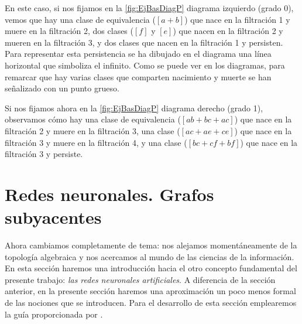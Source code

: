 \documentclass[12pt, a4paper, twoside]{book}
\numberwithin{equation}{section}
\theoremstyle{definition}
\newenvironment{ejem}
  {\pushQED{\qed}\renewcommand{\qedsymbol}{$\blacktriangleleft$}\ejemplo}
  {\popQED\endejemplo}
\theoremstyle{remark}
\theoremstyle{plain}
\begin{document}
\begin{ejem}
	En este caso, si nos fijamos en la \autoref{fig:EjBasDiagP} 
	diagrama izquierdo (grado 0), vemos
	que hay una clase de equivalencia ($[a+b]$) que nace en la 
	filtración 1 y muere en la filtración 2, dos clases ($[f]$ y $[e]$) 
	que 
	nacen en la filtración 2 y mueren en la filtración 3, y dos clases que
	nacen en la filtración 1 y persisten. Para representar esta 
	persistencia se ha dibujado en el diagrama una línea horizontal que 
	simboliza el infinito. Como se puede ver en los diagramas, para 
	remarcar que hay varias clases que comparten nacimiento y muerte se 
	han señalizado con un punto grueso.

	Si nos fijamos ahora en la \autoref{fig:EjBasDiagP} diagrama 
	derecho (grado 1), observamos cómo
	hay una clase de equivalencia ($[ab+bc+ac]$) que nace en la filtración 
	2
	y muere en la filtración 3, una clase ($[ac+ae+ce]$) que nace en la 
	filtración 3 y muere en la filtración 4, y una clase ($[bc+cf+bf]$) 
	que nace en la filtración 3 y persiste.
	\end{ejem}

	\section{Redes neuronales. Grafos subyacentes}
	
	Ahora cambiamos completamente de tema: nos alejamos momentáneamente de 
	la topología algebraica y nos acercamos al mundo 
	de las ciencias de la información. En esta sección haremos una
	introducción hacia el otro concepto fundamental del presente trabajo: 
	\emph{las redes neuronales artificiales}. A diferencia de la sección 
	anterior, en la presente sección haremos una aproximación un poco menos 
	formal de las nociones que se introducen. Para el desarrollo de esta 
	sección emplearemos la guía proporcionada por 
	\cite{Goodfellow-et-al-2016,IA-Jonathan,MDiscreta-Guti}.
\end{document}
